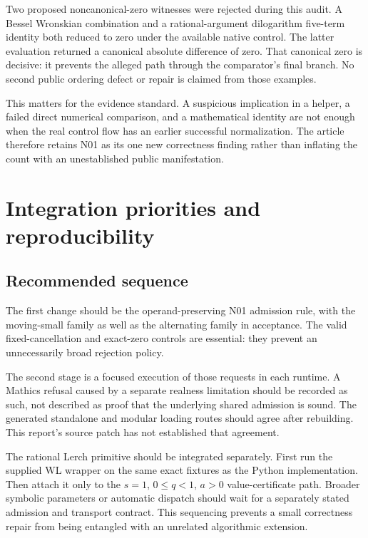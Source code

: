 \documentclass[11pt,a4paper]{article}
\theoremstyle{remark}\newtheorem{remark}[theorem]{Remark}
\newcommand{\code}[1]{\texttt{\detokenize{#1}}}
\begin{document}
Two proposed noncanonical-zero witnesses were rejected during this audit.
A Bessel Wronskian combination and a rational-argument dilogarithm five-term
identity both reduced to zero under the available native \code{FullSimplify}
control. The latter evaluation returned a canonical absolute difference of zero.
That canonical zero is decisive: it prevents the alleged
path through the comparator's final branch. No second public ordering defect or
repair is claimed from those examples.

This matters for the evidence standard. A suspicious implication in a helper,
a failed direct numerical comparison, and a mathematical identity are not enough
when the real control flow has an earlier successful normalization. The article
therefore retains N01 as its one new correctness finding rather than inflating
the count with an unestablished public manifestation.

\section{Integration priorities and reproducibility}
\label{sec:reproduce}

\subsection{Recommended sequence}

The first change should be the operand-preserving N01 admission rule, with the
moving-small family as well as the alternating family in acceptance. The valid
fixed-cancellation and exact-zero controls are essential: they prevent an
unnecessarily broad rejection policy.

The second stage is a focused execution of those requests in each runtime.
A Mathics refusal caused by a separate realness limitation should be recorded
as such, not described as proof that the underlying shared admission is sound.
The generated standalone and modular loading routes should agree after rebuilding.
This report's source patch has not established that agreement.

The rational Lerch primitive should be integrated separately. First run the
supplied WL wrapper on the same exact fixtures as the Python implementation.
Then attach it only to the $s=1$, $0\leq q<1$, $a>0$ value-certificate path.
Broader symbolic parameters or automatic dispatch should wait for a separately
stated admission and transport contract. This sequencing prevents a small
correctness repair from being entangled with an unrelated algorithmic extension.
\end{document}
